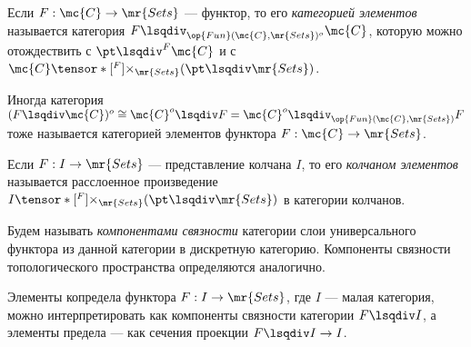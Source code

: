 \documentclass[
	extrafontsizes,
	11pt,
	hyphens,
]{memoir}
\begin{document}
\begin{definition}
Если \(F : \mc{C} \to \mr{Sets}\) --- функтор, то его \emph{категорией элементов} называется категория
\(F \lsqdiv_{\op{Fun}(\mc{C},\mr{Sets})^o} \mc{C}\),
которую можно отождествить с
\(\pt \lsqdiv^F \mc{C}\) и с \(\mc{C} \tensor*[^F]{\times}{_{\mr{Sets}}} (\pt \lsqdiv \mr{Sets})\).
\end{definition}


\begin{remark}
Иногда категория
\((F \lsqdiv \mc{C})^o \cong \mc{C}^o \lsqdiv F = \mc{C}^o \lsqdiv_{\op{Fun}(\mc{C},\mr{Sets})} F\)
тоже называется категорией элементов функтора \(F : \mc{C} \to \mr{Sets}\).
\end{remark}

\begin{definition}
Если \(F : I \to \mr{Sets}\) --- представление колчана \(I\), то его \emph{колчаном элементов} называется расслоенное произведение
\(I \tensor*[^F]{\times}{_{\mr{Sets}}} (\pt \lsqdiv \mr{Sets})\)
в категории колчанов.
\end{definition}

\begin{definition}[\scshape Компоненты связности]
Будем называть \emph{компонентами связности} категории слои универсального функтора из данной категории в дискретную категорию.
Компоненты связности топологического пространства определяются аналогично.
\end{definition}

\begin{example}
Элементы копредела функтора \(F: I \to \mr{Sets}\), где \(I\) --- малая категория, можно интерпретировать как компоненты связности категории \(F \lsqdiv I\), а элементы предела --- как сечения проекции \(F \lsqdiv I \to I\).
\end{example}
\end{document}
